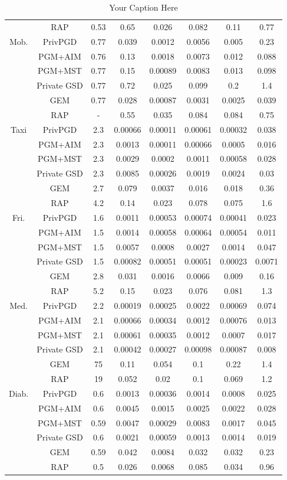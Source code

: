 \begin{table*}[ht]
\begin{tabular}{cccccccc}
 & RAP&0.53 & 0.65 & 0.026 & 0.082 & 0.11 & 0.77 \\
\multirow{6}{*}{Mob. } & PrivPGD&0.77 & 0.039 & 0.0012 & 0.0056 & 0.005 & 0.23 \\
 & PGM+AIM&0.76 & 0.13 & 0.0018 & 0.0073 & 0.012 & 0.088 \\
 & PGM+MST&0.77 & 0.15 & 0.00089 & 0.0083 & 0.013 & 0.098 \\
 & Private GSD&0.77 & 0.72 & 0.025 & 0.099 & 0.2 & 1.4 \\
 & GEM&0.77 & 0.028 & 0.00087 & 0.0031 & 0.0025 & 0.039 \\
 & RAP&- & 0.55 & 0.035 & 0.084 & 0.084 & 0.75 \\
\multirow{6}{*}{Taxi } & PrivPGD&2.3 & 0.00066 & 0.00011 & 0.00061 & 0.00032 & 0.038 \\
 & PGM+AIM&2.3 & 0.0013 & 0.00011 & 0.00066 & 0.0005 & 0.016 \\
 & PGM+MST&2.3 & 0.0029 & 0.0002 & 0.0011 & 0.00058 & 0.028 \\
 & Private GSD&2.3 & 0.0085 & 0.00026 & 0.0019 & 0.0024 & 0.03 \\
 & GEM&2.7 & 0.079 & 0.0037 & 0.016 & 0.018 & 0.36 \\
 & RAP&4.2 & 0.14 & 0.023 & 0.078 & 0.075 & 1.6 \\
\multirow{6}{*}{Fri. } & PrivPGD&1.6 & 0.0011 & 0.00053 & 0.00074 & 0.00041 & 0.023 \\
 & PGM+AIM&1.5 & 0.0014 & 0.00058 & 0.00064 & 0.00054 & 0.011 \\
 & PGM+MST&1.5 & 0.0057 & 0.0008 & 0.0027 & 0.0014 & 0.047 \\
 & Private GSD&1.5 & 0.00082 & 0.00051 & 0.00051 & 0.00023 & 0.0071 \\
 & GEM&2.8 & 0.031 & 0.0016 & 0.0066 & 0.009 & 0.16 \\
 & RAP&5.2 & 0.15 & 0.023 & 0.076 & 0.081 & 1.3 \\
\multirow{6}{*}{Med. } & PrivPGD&2.2 & 0.00019 & 0.00025 & 0.0022 & 0.00069 & 0.074 \\
 & PGM+AIM&2.1 & 0.00066 & 0.00034 & 0.0012 & 0.00076 & 0.013 \\
 & PGM+MST&2.1 & 0.00061 & 0.00035 & 0.0012 & 0.0007 & 0.017 \\
 & Private GSD&2.1 & 0.00042 & 0.00027 & 0.00098 & 0.00087 & 0.008 \\
 & GEM&75 & 0.11 & 0.054 & 0.1 & 0.22 & 1.4 \\
 & RAP&19 & 0.052 & 0.02 & 0.1 & 0.069 & 1.2 \\
\multirow{6}{*}{Diab. } & PrivPGD&0.6 & 0.0013 & 0.00036 & 0.0014 & 0.0008 & 0.025 \\
 & PGM+AIM&0.6 & 0.0045 & 0.0015 & 0.0025 & 0.0022 & 0.028 \\
 & PGM+MST&0.59 & 0.0047 & 0.00029 & 0.0083 & 0.0017 & 0.045 \\
 & Private GSD&0.6 & 0.0021 & 0.00059 & 0.0013 & 0.0014 & 0.019 \\
 & GEM&0.59 & 0.042 & 0.0084 & 0.032 & 0.032 & 0.23 \\
 & RAP&0.5 & 0.026 & 0.0068 & 0.085 & 0.034 & 0.96 \\
\bottomrule
\end{tabular}
\caption{Your Caption Here}
\end{table*}
